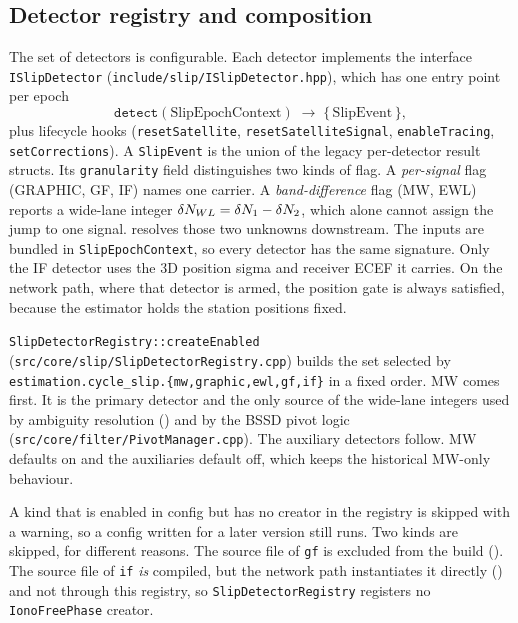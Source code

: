 \documentclass[main.tex]{subfiles}
\begin{document}
\subsection{Detector registry and composition}\label{sec:slip-registry}

The set of detectors is configurable.  Each detector implements the
interface \texttt{ISlipDetector}
(\texttt{include/slip/ISlipDetector.hpp}), which has one entry point per
epoch
\begin{equation*}
\texttt{detect}(\text{SlipEpochContext}) \;\longrightarrow\; \{\,\text{SlipEvent}\,\},
\end{equation*}
plus lifecycle hooks (\texttt{resetSatellite},
\texttt{resetSatelliteSignal}, \texttt{enableTracing},
\texttt{setCorrections}).  A \texttt{SlipEvent} is the union of the legacy
per-detector result structs.  Its \texttt{granularity} field
distinguishes two kinds of flag.  A \emph{per-signal} flag (GRAPHIC, GF,
IF) names one carrier.  A \emph{band-difference} flag (MW, EWL) reports a
wide-lane integer $\delta N_{WL} = \delta N_1 - \delta N_2$, which alone
cannot assign the jump to one signal.   resolves those
two unknowns downstream.  The inputs are bundled in
\texttt{SlipEpochContext}, so every detector has the same signature.
Only the IF detector uses the 3D position sigma and receiver ECEF it
carries.  On the network path, where that detector is armed, the
position gate is always satisfied, because the estimator holds the
station positions fixed.

\texttt{SlipDetectorRegistry::createEnabled}
(\texttt{src/core/slip/SlipDetectorRegistry.cpp}) builds the
set selected by
\texttt{estimation.cycle\_slip.\{mw,graphic,ewl,gf,if\}} in a fixed
order.  MW comes first.  It is the primary detector and the only source
of the wide-lane integers used by ambiguity resolution
() and by the BSSD
pivot logic (\texttt{src/core/filter/PivotManager.cpp}).  The auxiliary
detectors follow.  MW defaults on and the auxiliaries default off, which
keeps the historical MW-only behaviour.

A kind that is enabled in config but has no creator in the registry is
skipped with a warning, so a config written for a later version still
runs.  Two kinds are skipped, for different reasons.  The source file
of \texttt{gf} is excluded from the build ().  The
source file of \texttt{if} \emph{is} compiled, but the network path
instantiates it directly () and not through this
registry, so \texttt{SlipDetectorRegistry} registers no
\texttt{IonoFreePhase} creator.
\end{document}
